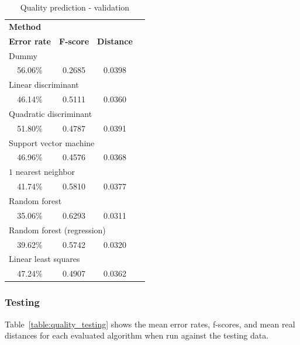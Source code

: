 \documentclass[twoside]{article}
\begin{document}
\begin{multicols}{2}
\begin{table}[H]
\caption{Quality prediction - validation}
\label{table:quality_validation}
\centering
\begin{tabular}{cccc}
\multicolumn{3}{l}{\textbf{Method}} \\
\textbf{Error rate} & \textbf{F-score} & \textbf{Distance} \\
\midrule
\multicolumn{3}{l}{Dummy} \\
56.06\% & 0.2685 & 0.0398 \\
\multicolumn{3}{l}{Linear discriminant} \\
46.14\% & 0.5111 & 0.0360 \\
\multicolumn{3}{l}{Quadratic discriminant} \\
51.80\% & 0.4787 & 0.0391 \\
\multicolumn{3}{l}{Support vector machine} \\
46.96\% & 0.4576 & 0.0368 \\
\multicolumn{3}{l}{$1$ nearest neighbor} \\
41.74\% & 0.5810 & 0.0377 \\
\multicolumn{3}{l}{Random forest} \\
35.06\% & 0.6293 & 0.0311 \\
\multicolumn{3}{l}{Random forest (regression)} \\
39.62\% & 0.5742 & 0.0320 \\
\multicolumn{3}{l}{Linear least squares} \\
47.24\% & 0.4907 & 0.0362 \\
\end{tabular}
\end{table}

\subsubsection{Testing}

Table~\ref{table:quality_testing} shows the mean error rates, f-scores, and mean real distances for each evaluated algorithm when run against the testing data.


\end{multicols}
\end{document}
